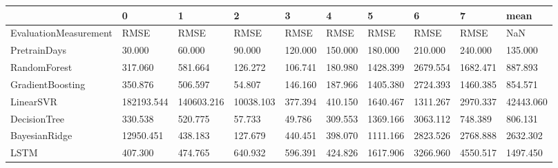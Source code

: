 \begin{tabular}{llllllllll}
\toprule
{} &          0 &          1 &         2 &       3 &       4 &        5 &        6 &        7 &      mean \\
\midrule
EvaluationMeasurement &       RMSE &       RMSE &      RMSE &    RMSE &    RMSE &     RMSE &     RMSE &     RMSE &       NaN \\
PretrainDays          &     30.000 &     60.000 &    90.000 & 120.000 & 150.000 &  180.000 &  210.000 &  240.000 &   135.000 \\
RandomForest          &    317.060 &    581.664 &   126.272 & 106.741 & 180.980 & 1428.399 & 2679.554 & 1682.471 &   887.893 \\
GradientBoosting      &    350.876 &    506.597 &    54.807 & 146.160 & 187.966 & 1405.380 & 2724.393 & 1460.385 &   854.571 \\
LinearSVR             & 182193.544 & 140603.216 & 10038.103 & 377.394 & 410.150 & 1640.467 & 1311.267 & 2970.337 & 42443.060 \\
DecisionTree          &    330.538 &    520.775 &    57.733 &  49.786 & 309.553 & 1369.166 & 3063.112 &  748.389 &   806.131 \\
BayesianRidge         &  12950.451 &    438.183 &   127.679 & 440.451 & 398.070 & 1111.166 & 2823.526 & 2768.888 &  2632.302 \\
LSTM                  &    407.300 &    474.765 &   640.932 & 596.391 & 424.826 & 1617.906 & 3266.960 & 4550.517 &  1497.450 \\
\bottomrule
\end{tabular}
